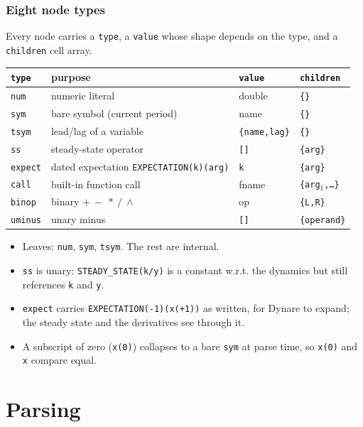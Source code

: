 \documentclass[10pt,slidestop]{beamer}
\newcommand{\code}[1]{\texttt{#1}}
\begin{document}
\begin{frame}\frametitle{Eight node types}
  Every node carries a \code{type}, a \code{value} whose shape depends on the
  type, and a \code{children} cell array.

  \medskip
  \begin{center}\scriptsize
  \begin{tabular}{@{}llll@{}}
    \toprule
    \code{type} & purpose & \code{value} & \code{children} \\
    \midrule
    \code{num}    & numeric literal & double & \code{\{\}} \\
    \code{sym}    & bare symbol (current period) & name & \code{\{\}} \\
    \code{tsym}   & lead/lag of a variable & \code{\{name,lag\}} & \code{\{\}} \\
    \code{ss}     & steady-state operator & \code{[]} & \code{\{arg\}} \\
    \code{expect} & dated expectation \code{EXPECTATION(k)(arg)} & \code{k} & \code{\{arg\}} \\
    \code{call}   & built-in function call & fname & \code{\{arg$_1$,\dots\}} \\
    \code{binop}  & binary $+\ -\ *\ /\ \wedge$ & op & \code{\{L,R\}} \\
    \code{uminus} & unary minus & \code{[]} & \code{\{operand\}} \\
    \bottomrule
  \end{tabular}
  \end{center}

  \medskip
  \begin{itemize}
  \item Leaves: \code{num}, \code{sym}, \code{tsym}. The rest are internal.
  \item \code{ss} is unary: \code{STEADY\_STATE(k/y)} is a constant w.r.t. the
    dynamics but still references \code{k} and \code{y}.
  \item \code{expect} carries \code{EXPECTATION(-1)(x(+1))} as written, for Dynare to
    expand; the steady state and the derivatives see through it.
  \item A subscript of zero (\code{x(0)}) collapses to a bare \code{sym} at parse
    time, so \code{x(0)} and \code{x} compare equal.
  \end{itemize}
\end{frame}

\section{Parsing}
\end{document}
